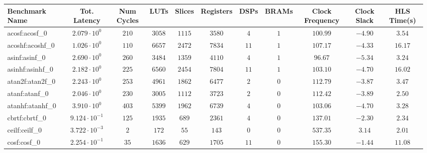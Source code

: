 \begin{tabular}{|l|c|c|c|c|c|c|c|c|c|c|}
\hline
Benchmark Name               & Tot. Latency            & Num Cycles & LUTs       & Slices    & Registers  & DSPs    & BRAMs & Clock Frequency & Clock Slack & HLS Time(s) \\
\hline
acosf:acosf\_0               & $ 2.079 \cdot 10^{0}  $ & $ 210    $ & $ 3058   $ & $ 1115  $ & $ 3580   $ & $ 4   $ & $ 1 $ & $ 100.99      $ & $ -4.90   $ & $ 3.54    $ \\
acoshf:acoshf\_0             & $ 1.026 \cdot 10^{0}  $ & $ 110    $ & $ 6657   $ & $ 2472  $ & $ 7834   $ & $ 11  $ & $ 1 $ & $ 107.17      $ & $ -4.33   $ & $ 16.17   $ \\
asinf:asinf\_0               & $ 2.690 \cdot 10^{0}  $ & $ 260    $ & $ 3484   $ & $ 1359  $ & $ 4110   $ & $ 4   $ & $ 1 $ & $ 96.67       $ & $ -5.34   $ & $ 3.24    $ \\
asinhf:asinhf\_0             & $ 2.182 \cdot 10^{0}  $ & $ 225    $ & $ 6560   $ & $ 2454  $ & $ 7804   $ & $ 11  $ & $ 1 $ & $ 103.10      $ & $ -4.70   $ & $ 16.02   $ \\
atan2f:atan2f\_0             & $ 2.243 \cdot 10^{0}  $ & $ 253    $ & $ 4961   $ & $ 1862  $ & $ 6477   $ & $ 2   $ & $ 0 $ & $ 112.79      $ & $ -3.87   $ & $ 3.47    $ \\
atanf:atanf\_0               & $ 2.046 \cdot 10^{0}  $ & $ 230    $ & $ 3005   $ & $ 1112  $ & $ 3723   $ & $ 2   $ & $ 0 $ & $ 112.42      $ & $ -3.89   $ & $ 2.50    $ \\
atanhf:atanhf\_0             & $ 3.910 \cdot 10^{0}  $ & $ 403    $ & $ 5399   $ & $ 1962  $ & $ 6739   $ & $ 4   $ & $ 0 $ & $ 103.06      $ & $ -4.70   $ & $ 3.28    $ \\
cbrtf:cbrtf\_0               & $ 9.124 \cdot 10^{-1} $ & $ 125    $ & $ 1935   $ & $ 689   $ & $ 2361   $ & $ 4   $ & $ 0 $ & $ 137.01      $ & $ -2.30   $ & $ 2.34    $ \\
ceilf:ceilf\_0               & $ 3.722 \cdot 10^{-3} $ & $ 2      $ & $ 172    $ & $ 55    $ & $ 143    $ & $ 0   $ & $ 0 $ & $ 537.35      $ & $ 3.14    $ & $ 2.01    $ \\
cosf:cosf\_0                 & $ 2.254 \cdot 10^{-1} $ & $ 35     $ & $ 1636   $ & $ 629   $ & $ 1705   $ & $ 11  $ & $ 0 $ & $ 155.30      $ & $ -1.44   $ & $ 11.08   $ \\

\end{tabular}
